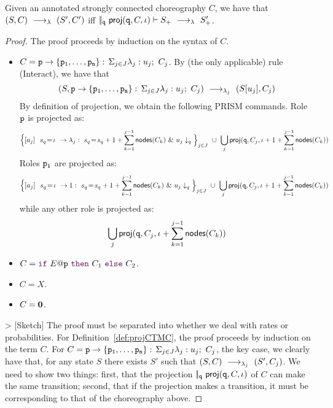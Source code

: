\begin{theorem}[Projection]\label{thm:epp}
  Given an annotated strongly connected choreography $C$, we have that
  $(S,C) \ \longrightarrow_{\lambda}\  (S', C')$ iff
  $|\!|_{\mathtt{q}}\ \mathsf{proj} (\mathtt{q}, C,\iota)\vdash S_{+} \ \longrightarrow_{\lambda}\ 
  S_{+}'$.
\end{theorem}
\begin{proof}
  The proof proceeds by induction on the syntax of $C$.
  \begin{itemize}
  \item $C=\mathtt{p}\rightarrow \{\mathtt{\mathtt{p}_1,\ldots,\mathtt{p}_n}\}:\,\Sigma_{j\in J}\lambda_j: u_j;\ C_j$.  By (the only
    applicable) rule \textsf{(Interact)}, we have that
    \[
      (S, \mathtt{p}\rightarrow \{\mathtt{\mathtt{p}_1,\ldots,\mathtt{p}_n}\}:\,\Sigma_{j\in J}\lambda_j: u_j;\ C_j)
      \ \longrightarrow_{\lambda_j}\  (S[u_j], C_j) 
    \]
    By definition of projection, we obtain the following PRISM
    commands. Role $\mathtt{p}$ is projected as:
    \[
      \Big\{[a_j]\ \ s_{q}\!=\! \iota\ \rightarrow \lambda_j:\ s_{q}\!=\!
        s_{q} +1+\sum_{k=1}^{j-1}\mathsf{nodes}({C_k})\ \&\ u_j\downarrow_q\Big\}_{j\in J}
      \ \cup\ \bigcup_{j} \mathsf{proj} (\mathtt{q}, C_j,
      \iota+1+\sum_{k=1}^{j-1}\mathsf{nodes}({C_k}))
    \]
    Roles $\mathtt{p_i}$ are projected as:
    \[
      \Big\{[a_j]\ \ s_{q}\!=\! \iota\ \rightarrow 1:\ s_{q}\!=\!
        s_{q} +1+\sum_{k=1}^{j-1}\mathsf{nodes}({C_k})\ \&\ u_j\downarrow_q\Big\}_{j\in J}
      \ \cup\ \bigcup_{j} \mathsf{proj} (\mathtt{q}, C_j, \iota+1+\sum_{k=1}^{j-1}\mathsf{nodes}({C_k}))
    \]
    while any other role is projected as: 
    \[\bigcup_{j} \mathsf{proj} (\mathtt{q}, C_j, \iota+\sum_{k=1}^{j-1}\mathsf{nodes}({C_k}))
    \]

  \item $C=\ifTE {E}{p}{C_1}{C_2}$.

  \item $C=X$.

  \item $C=\mathbf{0}$.

  \end{itemize}




  > [Sketch] The proof must be separated into whether we deal with
  rates or probabilities. For Definition~\ref{def:projCTMC}, the proof
  proceeds by induction on the term $C$. For
  $C=\mathtt{p}\rightarrow \{\mathtt{\mathtt{p}_1,\ldots,\mathtt{p}_n}\}:\,\Sigma_{j\in J}\lambda_j: u_j;\ C_j$, the key case, we
  clearly have that, for any state $S$ there exists $S'$ such that
  $(S,C)\ \longrightarrow_{\lambda_j}\ (S',C_j)$. We need to show two things: first,
  that the projection $|\!|_{\mathtt{q}}\ \mathsf{proj}{(\mathtt{q},C,\iota)}$ of $C$
  can make the same transition; second, that if the projection makes a
  transition, it must be corresponding to that of the choreography
  above.


\end{proof}
